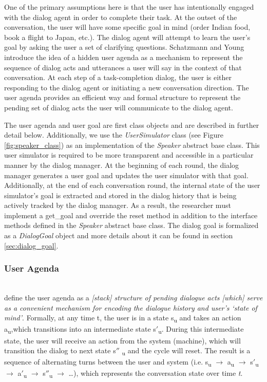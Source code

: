 One of the primary assumptions here is that the user has intentionally engaged with the dialog agent in order to complete their task. At the outset of the conversation, the user will have some specific goal in mind (order Indian food, book a flight to Japan, etc.). The dialog agent will attempt to learn the user's goal by asking the user a set of clarifying questions. Schatzmann and Young introduce the idea of a hidden user agenda as a mechanism to represent the sequence of dialog acts and utterances a user will say in the context of that conversation. At each step of a task-completion dialog, the user is either responding to the dialog agent or initiating a new conversation direction. The user agenda provides an efficient way and formal structure to represent the pending set of dialog acts the user will communicate to the dialog agent.

The user agenda and user goal are first class objects and are described in further detail below. Additionally, we use the \textit{UserSimulator} class (see Figure \ref{fig:speaker_class}) as an implementation of the \textit{Speaker} abstract base class. This user simulator is required to be more transparent and accessible in a particular manner by the dialog manager. At the beginning of each round, the dialog manager generates a user goal and updates the user simulator with that goal. Additionally, at the end of each conversation round, the internal state of the user simulator's goal is extracted and stored in the dialog history that is being actively tracked by the dialog manager. As a result, the researcher must implement a get\_goal and override the reset method in addition to the interface methods defined in the \textit{Speaker} abstract base class. The dialog goal is formalized as a \textit{DialogGoal} object and more details about it can be found in section \ref{sec:dialog_goal}. 

\subsubsection{User Agenda} 
~ \\
\cite{Schatzmann2009TheHA} define the user agenda as a \textit{[stack] structure of pending dialogue acts [which] serve as a convenient mechanism for encoding the dialogue history and user’s ‘state of mind’}. Formally, at any time t, the user is in a state s\textsubscript{u} and takes an action a\textsubscript{u},which transitions into an intermediate state s$'$\textsubscript{u}. During this intermediate state, the user will receive an action from the system (machine), which will transition the dialog to next state s$''$ \textsubscript{u} and the cycle will reset. The result is a sequence of alternating turns between the user and system (i.e. s\textsubscript{u} $\rightarrow$ a\textsubscript{u} $\rightarrow$ s$'$\textsubscript{u} $\rightarrow$ a$'$\textsubscript{u} $\rightarrow$ s$''$\textsubscript{u} $\rightarrow$ \dots), which represents the conversation state over time \textit{t}.

